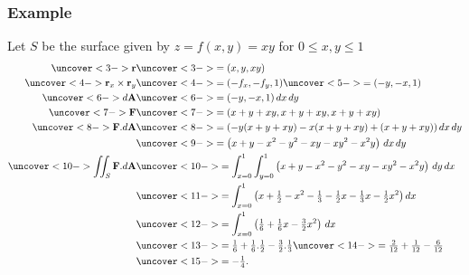 \documentclass[9pt]{beamer}
\begin{document}
\begin{frame}[t]
 \frametitle{Example}
 Let $S$ be the surface given by $z=f(x,y)=xy$ for $0\leq x,y\leq 1$
 \begin{align*}
  \uc<3->{\vr} &\uc<3->{= (x,y,xy)} \\
  \uc<4->{\vr_x\tm\vr_y} &\uc<4->{= (-f_x,-f_y,1)}\uc<5->{ = (-y,-x,1)} \\
  \uc<6->{d\vA} &\uc<6->{= (-y,-x,1)\,dx\,dy} \\
  \uc<7->{\vF} &\uc<7->{= (x+y+xy,x+y+xy,x+y+xy)} \\
  \uc<8->{\vF.d\vA} &\uc<8->{= \left(-y(x+y+xy)-x(x+y+xy)+(x+y+xy)\right)dx\,dy} \\
   &\uc<9->{= \left(x+y-x^2-y^2-xy-xy^2-x^2y\right)\,dx\,dy} \\
  \uc<10->{\iint_S \vF.d\vA} &\uc<10->{= 
   \int_{x=0}^1 \int_{y=0}^1
    \left(x+y-x^2-y^2-xy-xy^2-x^2y\right)\,dy\,dx} \\
   &\uc<11->{= \int_{x=0}^1 
      \left(x+\half-x^2-\tfrac{1}{3}-\half x-\tfrac{1}{3}x-\half
       x^2\right)dx} \\
   &\uc<12->{= \int_{x=0}^1 \left(\tfrac{1}{6} +\tfrac{1}{6}x
    -\tfrac{3}{2}x^2\right)\,dx} \\
   &\uc<13->{= \tfrac{1}{6} + \tfrac{1}{6}.\half -\tfrac{3}{2}.\tfrac{1}{3} }
     \uc<14->{= \tfrac{2}{12} + \tfrac{1}{12} - \tfrac{6}{12}} \\
   &\uc<15->{= -\tfrac{1}{4}.}
 \end{align*}
\end{frame}

\end{document}
